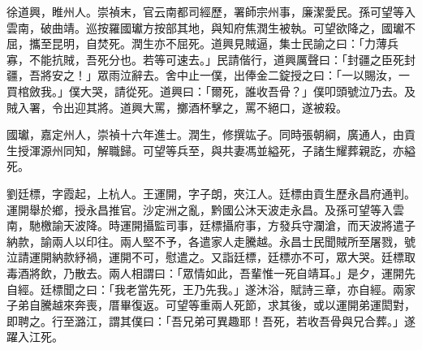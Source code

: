 \begin{pinyinscope}
徐道興，睢州人。崇禎末，官云南都司經歷，署師宗州事，廉潔愛民。孫可望等入雲南，破曲靖。巡按羅國瓛方按部其地，與知府焦潤生被執。可望欲降之，國瓛不屈，攜至昆明，自焚死。潤生亦不屈死。道興見賊逼，集士民諭之曰：「力薄兵寡，不能抗賊，吾死分也。若等可速去。」民請偕行，道興厲聲曰：「封疆之臣死封疆，吾將安之！」眾雨泣辭去。舍中止一僕，出俸金二錠授之曰：「一以賜汝，一買棺斂我。」僕大哭，請從死。道興曰：「爾死，誰收吾骨？」僕叩頭號泣乃去。及賊入署，令出迎其將。道興大罵，擲酒杯擊之，罵不絕口，遂被殺。

國瓛，嘉定州人，崇禎十六年進士。潤生，修撰竑子。同時張朝綱，廣通人，由貢生授渾源州同知，解職歸。可望等兵至，與共妻馮並縊死，子諸生耀葬親訖，亦縊死。

劉廷標，字霞起，上杭人。王運開，字子朗，夾江人。廷標由貢生歷永昌府通判。運開舉於鄉，授永昌推官。沙定洲之亂，黔國公沐天波走永昌。及孫可望等入雲南，馳檄諭天波降。時運開攝監司事，廷標攝府事，方發兵守瀾滄，而天波將遣子納款，諭兩人以印往。兩人堅不予，各遣家人走騰越。永昌士民聞賊所至屠戮，號泣請運開納款紓禍，運開不可，慰遣之。又詣廷標，廷標亦不可，眾大哭。廷標取毒酒將飲，乃散去。兩人相謂曰：「眾情如此，吾輩惟一死自靖耳。」是夕，運開先自經。廷標聞之曰：「我老當先死，王乃先我。」遂沐浴，賦詩三章，亦自經。兩家子弟自騰越來奔喪，厝畢復返。可望等重兩人死節，求其後，或以運開弟運閎對，即聘之。行至潞江，謂其僕曰：「吾兄弟可異趣耶！吾死，若收吾骨與兄合葬。」遂躍入江死。


\end{pinyinscope}